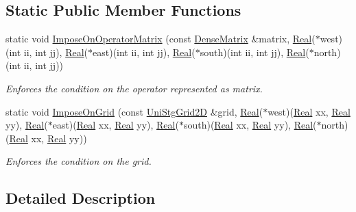 \subsection*{Static Public Member Functions}
\begin{DoxyCompactItemize}
\item 
static void \hyperlink{classmtk_1_1BCDesc2D_a1d03ee7abaa6d95649a9ba3c71e407cd}{Impose\+On\+Operator\+Matrix} (const \hyperlink{classmtk_1_1DenseMatrix}{Dense\+Matrix} \&matrix, \hyperlink{group__c01-roots_gac080bbbf5cbb5502c9f00405f894857d}{Real}($\ast$west)(int ii, int jj), \hyperlink{group__c01-roots_gac080bbbf5cbb5502c9f00405f894857d}{Real}($\ast$east)(int ii, int jj), \hyperlink{group__c01-roots_gac080bbbf5cbb5502c9f00405f894857d}{Real}($\ast$south)(int ii, int jj), \hyperlink{group__c01-roots_gac080bbbf5cbb5502c9f00405f894857d}{Real}($\ast$north)(int ii, int jj))
\begin{DoxyCompactList}\small\item\em Enforces the condition on the operator represented as matrix. \end{DoxyCompactList}\item 
static void \hyperlink{classmtk_1_1BCDesc2D_affa73a9a06d4fa32cb97ed8cc96f0010}{Impose\+On\+Grid} (const \hyperlink{classmtk_1_1UniStgGrid2D}{Uni\+Stg\+Grid2\+D} \&grid, \hyperlink{group__c01-roots_gac080bbbf5cbb5502c9f00405f894857d}{Real}($\ast$west)(\hyperlink{group__c01-roots_gac080bbbf5cbb5502c9f00405f894857d}{Real} xx, \hyperlink{group__c01-roots_gac080bbbf5cbb5502c9f00405f894857d}{Real} yy), \hyperlink{group__c01-roots_gac080bbbf5cbb5502c9f00405f894857d}{Real}($\ast$east)(\hyperlink{group__c01-roots_gac080bbbf5cbb5502c9f00405f894857d}{Real} xx, \hyperlink{group__c01-roots_gac080bbbf5cbb5502c9f00405f894857d}{Real} yy), \hyperlink{group__c01-roots_gac080bbbf5cbb5502c9f00405f894857d}{Real}($\ast$south)(\hyperlink{group__c01-roots_gac080bbbf5cbb5502c9f00405f894857d}{Real} xx, \hyperlink{group__c01-roots_gac080bbbf5cbb5502c9f00405f894857d}{Real} yy), \hyperlink{group__c01-roots_gac080bbbf5cbb5502c9f00405f894857d}{Real}($\ast$north)(\hyperlink{group__c01-roots_gac080bbbf5cbb5502c9f00405f894857d}{Real} xx, \hyperlink{group__c01-roots_gac080bbbf5cbb5502c9f00405f894857d}{Real} yy))
\begin{DoxyCompactList}\small\item\em Enforces the condition on the grid. \end{DoxyCompactList}\end{DoxyCompactItemize}


\subsection{Detailed Description}


